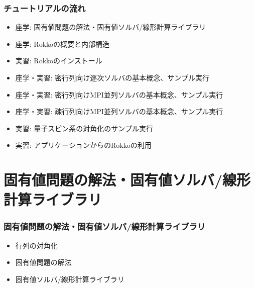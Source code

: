 \begin{frame}
  \frametitle{チュートリアルの流れ}
  \begin{itemize}
  \item 座学: 固有値問題の解法・固有値ソルバ/線形計算ライブラリ
  \item 座学: Rokkoの概要と内部構造
  \item 実習: Rokkoのインストール
  \item 座学・実習: 密行列向け逐次ソルバの基本概念、サンプル実行
  \item 座学・実習: 密行列向けMPI並列ソルバの基本概念、サンプル実行
  \item 座学・実習: 疎行列向けMPI並列ソルバの基本概念、サンプル実行
  \item 実習: 量子スピン系の対角化のサンプル実行
  \item 実習: アプリケーションからのRokkoの利用
  \end{itemize}
\end{frame}


\section{固有値問題の解法・固有値ソルバ/線形計算ライブラリ}

\begin{frame}
  \frametitle{固有値問題の解法・固有値ソルバ/線形計算ライブラリ}
  \begin{itemize}
    \setlength{\itemsep}{1em}
  \item 行列の対角化
  \item 固有値問題の解法
  \item 固有値ソルバ/線形計算ライブラリ
  \end{itemize}
\end{frame}

